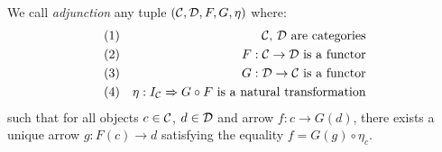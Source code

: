 \begin{defin}\label{Adj:def:adjunction}
    We call {\em adjunction} any tuple $(\mbox{$\cal C$},\mbox{$\cal D$},F,G,\eta)$ where:
        \begin{eqnarray*}
            (1)& &\mbox{\mbox{$\cal C$}, \mbox{$\cal D$}\ are categories}\\
            (2)& &\mbox{$F:\mbox{$\cal C$}\to\mbox{$\cal D$}$ is a functor}\\
            (3)& &\mbox{$G:\mbox{$\cal D$}\to\mbox{$\cal C$}$ is a functor}\\
            (4)& &\mbox{$\eta:I_{\cal C}\Rightarrow G\circ F$ is a natural
                transformation}
        \end{eqnarray*}
    such that for all objects $c\in\mbox{$\cal C$}$, $d\in\mbox{$\cal D$}$ and arrow $f:c\to G(d)$, 
    there exists a unique arrow $g:F(c) \to d$ satisfying the equality 
    $f = G(g) \circ \eta_{c}$.
\end{defin}






